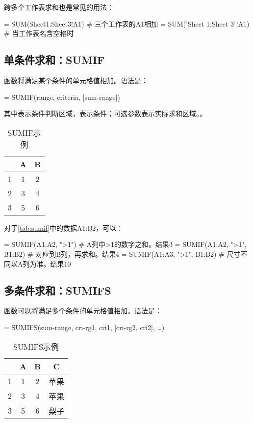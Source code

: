 跨多个工作表求和也是常见的用法：
\begin{excode}
= SUM(Sheet1:Sheet3!A1)  # 三个工作表的A1相加
= SUM('Sheet 1:Sheet 3'!A1)  # 当工作表名含空格时
\end{excode}

\subsection{单条件求和：SUMIF}
\label{fun:sumif}
函数将满足某个条件的单元格值相加。语法是：
\begin{syntax}
= SUMIF(range, criteria, [sum-range])
\end{syntax}

其中表示条件判断区域，表示条件；可选参数表示实际求和区域。。

\begin{table}[!hbt]
    \centering
    \caption{SUMIF示例}\label{tab:sumif}
    \begin{tabular}{c|cc}
    \hline
      & A & B \\
    \hline
    1 & 1 & 2 \\
    2 & 3 & 4 \\
    3 & 5 & 6 \\
    \hline
    \end{tabular}
\end{table}

对于\autoref{tab:sumif}中的数据A1:B2，可以：
\begin{excode}
= SUMIF(A1:A2, ">1")  # A列中>1的数字之和。结果3
= SUMIF(A1:A2, ">1", B1:B2)  # 对应到B列，再求和。结果4
= SUMIF(A1:A3, ">1", B1:B2)  # 尺寸不同以A列为准。结果10
\end{excode}

\subsection{多条件求和：SUMIFS}
\label{fun:sumifs}
函数可以将满足多个条件的单元格值相加。语法是：
\begin{syntax}
= SUMIFS(sum-range, cri-rg1, cri1, [cri-rg2, cri2], \ldots)
\end{syntax}

\begin{table}[!hbt]
    \centering
    \caption{SUMIFS示例}\label{tab:sumifs}
    \begin{tabular}{c|ccc}
    \hline
      & A & B & C \\
    \hline
    1 & 1 & 2 & 苹果\\
    2 & 3 & 4 & 苹果\\
    3 & 5 & 6 & 梨子\\
    \hline
    \end{tabular}
\end{table}


